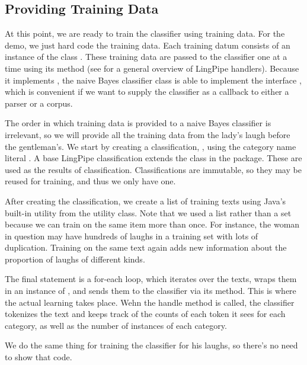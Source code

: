 \subsection{Providing Training Data}

At this point, we are ready to train the classifier using training
data.  For the demo, we just hard code the training data.  Each
training datum consists of an instance of the class
.  These training data are passed to
the classifier one at a time using its  method (see
 for a general overview of LingPipe handlers).
Because it implements , the
naive Bayes classifier class is able to implement the interface
, which is convenient if
we want to supply the classifier as a callback to either a parser or a
corpus.

The order in which training data is provided to a naive
Bayes classifier is irrelevant, so we will provide all the
training data from the lady's laugh before the gentleman's.
%
%
We start by creating a classification, , using the
category name literal .  A base LingPipe classification
extends the  class in the
 package.  These are used as the results of
classification.  Classifications are immutable, so they may be reused
for training, and thus we only have one.

After creating the classification, we create a list of training texts
using Java's built-in utility  from the 
utility class.  Note that we used a list rather than a set because we
can train on the same item more than once.  For instance, the woman in
question may have hundreds of laughs in a training set with lots of
duplication.  Training on the same text again adds new information
about the proportion of laughs of different kinds. 

The final statement is a for-each loop, which iterates over the texts,
wraps them in an instance of , and
sends them to the classifier via its
 method.  This is where the
actual learning takes place.  Wehn the handle method is called, the
classifier tokenizes the text and keeps track of the counts of each
token it sees for each category, as well as the number of instances
of each category.  

We do the same thing for training the classifier for his laughs,
so there's no need to show that code.

